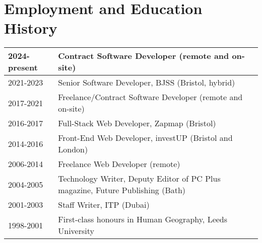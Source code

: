 \documentclass[a4paper,10pt]{article}
\newcommand{\resumeHeading}[1]{
  \section*{#1}
}
\begin{document}
  \begin{minipage}{\textwidth}
    \resumeHeading{Employment and Education History}

    \begingroup
      \setlength{\tabcolsep}{6pt}
      \renewcommand{\arraystretch}{1.2}  %
      \begin{tabular*}{\textwidth}{l|l@{\extracolsep{\fill}}}
        \small{2024-present} & \small{Contract Software Developer (remote and on-site)} \\ \hline
        \small{2021-2023} & \small{Senior Software Developer, BJSS (Bristol, hybrid)} \\ \hline
        \small{2017-2021} & \small{Freelance/Contract Software Developer (remote and on-site)} \\ \hline
        \small{2016-2017} & \small{Full-Stack Web Developer, Zapmap (Bristol)} \\ \hline
        \small{2014-2016} & \small{Front-End Web Developer, investUP (Bristol and London)} \\ \hline
        \small{2006-2014} & \small{Freelance Web Developer (remote)} \\ \hline
        \small{2004-2005} & \small{Technology Writer, Deputy Editor of PC Plus magazine, Future Publishing (Bath)} \\ \hline
        \small{2001-2003} & \small{Staff Writer, ITP (Dubai)} \\ \hline
        \small{1998-2001} & \small{First-class honours in Human Geography, Leeds University}
      \end{tabular*}
    \endgroup
  \end{minipage}
\end{document}
